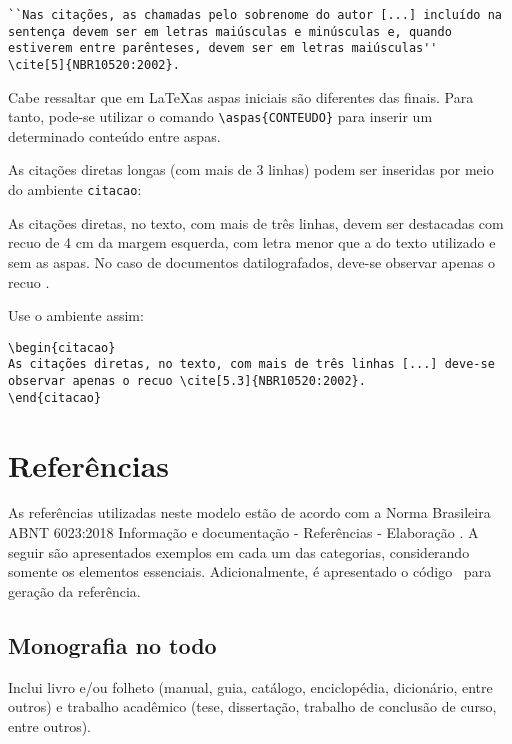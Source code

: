 \begin{verbatim}
``Nas citações, as chamadas pelo sobrenome do autor [...] incluído na 
sentença devem ser em letras maiúsculas e minúsculas e, quando 
estiverem entre parênteses, devem ser em letras maiúsculas''
\cite[5]{NBR10520:2002}.
\end{verbatim}

Cabe ressaltar que em \LaTeX as aspas iniciais são diferentes das finais. Para tanto, pode-se utilizar o comando \verb|\aspas{CONTEUDO}| para inserir um determinado conteúdo entre aspas.

As citações diretas longas (com mais de 3 linhas) podem ser inseridas por meio do ambiente \texttt{citacao}:

\begin{citacao}
As citações diretas, no texto, com mais de três linhas, devem ser
destacadas com recuo de 4 cm da margem esquerda, com letra menor que a do texto
utilizado e sem as aspas. No caso de documentos datilografados, deve-se
observar apenas o recuo \cite[5.3]{NBR10520:2002}.
\end{citacao}

Use o ambiente assim:

\begin{verbatim}
\begin{citacao}
As citações diretas, no texto, com mais de três linhas [...] deve-se 
observar apenas o recuo \cite[5.3]{NBR10520:2002}.
\end{citacao}
\end{verbatim}

\section{Referências}

As referências utilizadas neste modelo estão de acordo com a Norma Brasileira ABNT 6023:2018 Informação e documentação - Referências - Elaboração \cite{abnt}. A seguir são apresentados exemplos em cada um das categorias, considerando somente os elementos essenciais. Adicionalmente, é apresentado o código \BibTeX~para geração da referência.

\subsection{Monografia no todo}\label{sec:monografia}

Inclui livro e/ou folheto (manual, guia, catálogo, enciclopédia, dicionário, entre outros) e trabalho acadêmico (tese, dissertação, trabalho de conclusão de curso, entre outros).

